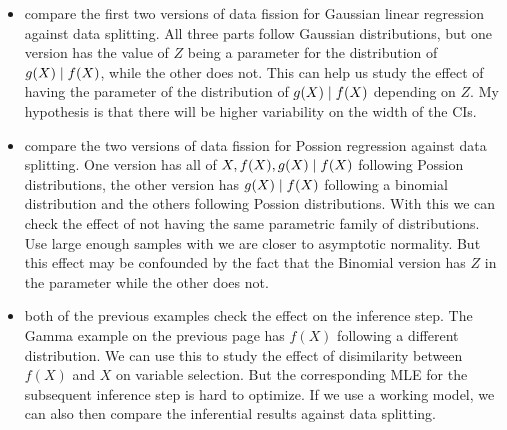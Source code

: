 \begin{itemize}
\item compare the first two versions of data fission for Gaussian linear regression against data splitting. All three parts follow Gaussian distributions, but one version has the value of $Z$ being a parameter for the distribution of $g(X)\mid f(X)$, while the other does not. This can help us study the effect of having the parameter of the distribution of $g(X)\mid f(X)$ depending on $Z$. My hypothesis is that there will be higher variability on the width of the CIs.
\item compare the two versions of data fission for Possion regression against data splitting. One version has all of $X, f(X), g(X)\mid f(X)$ following Possion distributions, the other version has $g(X)\mid f(X)$ following a binomial distribution and the others following Possion distributions. With this we can check the effect of not having the same parametric family of distributions. Use large enough samples with we are closer to asymptotic normality. But this effect may be confounded by the fact that the Binomial version has $Z$ in the parameter while the other does not.
\item both of the previous examples check the effect on the inference step. The Gamma example on the previous page has $f(X)$ following a different distribution. We can use this to study the effect of disimilarity between $f(X)$ and $X$ on variable selection. But the corresponding MLE for the subsequent inference step is hard to optimize. If we use a working model, we can also then compare the inferential results against data splitting.
\end{itemize}